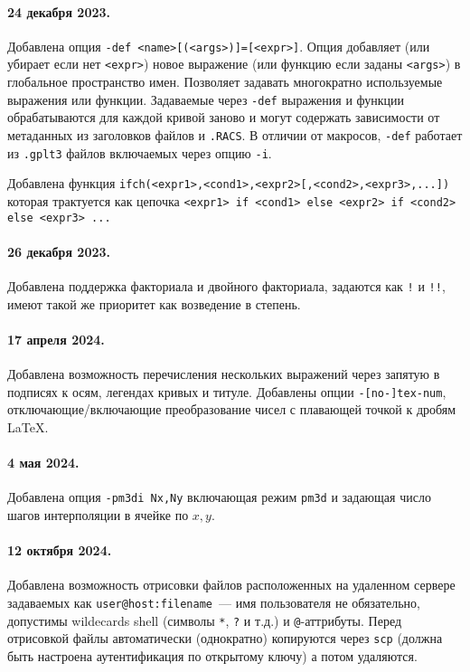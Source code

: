 \documentclass[12pt]{article}
\begin{document}
\paragraph{24 декабря 2023.} Добавлена опция \verb'-def <name>[(<args>)]=[<expr>]'. Опция добавляет (или убирает если нет \verb'<expr>')
новое выражение (или функцию если заданы \verb'<args>') в глобальное пространство имен. Позволяет задавать 
многократно используемые выражения или функции. Задаваемые через \verb'-def' выражения и функции
обрабатываются для каждой кривой заново и могут содержать зависимости от метаданных из 
заголовков файлов и \verb'.RACS'. 
В отличии от макросов, \verb'-def' работает из \verb'.gplt3' файлов включаемых через опцию \verb'-i'.

Добавлена функция \verb'ifch(<expr1>,<cond1>,<expr2>[,<cond2>,<expr3>,...])' которая трактуется как цепочка
\verb'<expr1> if <cond1> else <expr2> if <cond2> else <expr3> ...'

\paragraph{26 декабря 2023.} Добавлена поддержка факториала и двойного факториала, задаются как \verb'!' и \verb'!!', имеют такой же приоритет как возведение в степень.

\paragraph{17 апреля 2024.} Добавлена возможность перечисления нескольких выражений через запятую в подписях к осям, легендах кривых и титуле. Добавлены опции \verb'-[no-]tex-num', отключающие/включающие преобразование чисел с плавающей точкой к дробям \LaTeX.

\paragraph{4 мая 2024.} Добавлена опция \verb'-pm3di Nx,Ny' включающая режим \verb'pm3d' и задающая число шагов интерполяции в ячейке по $x,y$.

\paragraph{12 октября 2024.} Добавлена возможность отрисовки файлов расположенных на удаленном сервере задаваемых как \verb'user@host:filename'~---
имя пользователя не  обязательно, допустимы wildecards shell (символы \verb'*', \verb'?' и т.д.) и \verb'@'-аттрибуты.
Перед отрисовкой файлы автоматически (однократно) копируются через \verb'scp' (должна быть настроена аутентификация по открытому ключу) а потом удаляются.
\end{document}
